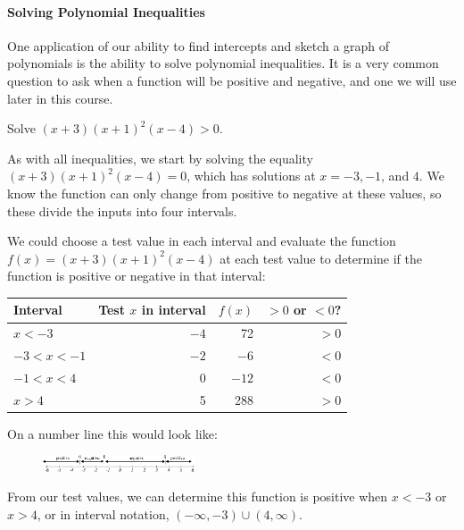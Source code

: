 \paragraph*{Solving Polynomial Inequalities}
One application of our ability to find intercepts and sketch a graph of polynomials is the ability to solve polynomial inequalities. It is a very common question to ask when a function will be positive and negative, and one we will use later in this course.

\begin{example}
Solve $(x+3)(x+1)^2(x-4)>0$.

\begin{solution} As with all inequalities, we start by solving the equality $(x+3)(x+1)^2(x-4)=0$, which has solutions at $x= -3, -1$, and $4$. We know the function can only change from positive to negative at these values, so these divide the inputs into four intervals.

We could choose a test value in each interval and evaluate the function $f(x)=(x+3)(x+1)^2(x-4)$ at each test value to determine if the function is positive or negative in that interval:

\begin{table}[!ht]
	\centering
  \begin{tabular}{lrrr}
    \toprule
    Interval     & Test $x$ in interval & $f(x)$ & $ > 0$ or $< 0$?\\
    \midrule
    $x < -3$     & $-4$                 & 72     & $ > 0 $\\
    $-3< x< -1$  & $-2$                 & $-6$   & $ < 0$\\
    $-1 < x < 4$ &   0                  & $-12$  & $ < 0$\\
    $x > 4 $     &   5                  & 288    & $ > 0 $\\
    \bottomrule
\end{tabular}
\end{table}
On a number line this would look like:

\begin{figure}[!ht]
\centering
\includegraphics[width=0.4\textwidth]{img/chap1/sec1-5/image068.png}
\caption{}
\end{figure}
From our test values, we can determine this function is positive when $x<-3$ or $x>4$, or in interval notation, $(-\infty,-3)\cup (4,\infty)$.
\end{solution}\end{example}

